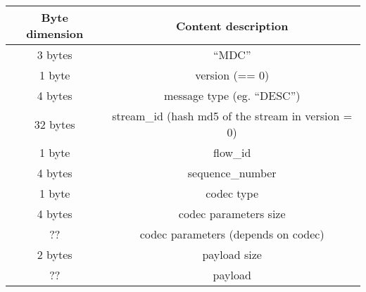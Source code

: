 \begin{center} \begin{tabular}{|c|c|}
\hline
Byte dimension & Content description\\
\hline \hline
3 bytes & ``MDC''\\
1 byte & version (== 0)\\
4 bytes & message type (eg. ``DESC'')\\
32 bytes & stream\_id (hash md5 of the stream in version = 0)\\
1 byte & flow\_id\\
4 bytes & sequence\_number\\
1 byte & codec type\\
4 bytes & codec parameters size\\
?? & codec parameters (depends on codec)\\
2 bytes & payload size\\
?? & payload\\
\hline
\end{tabular} \end{center}